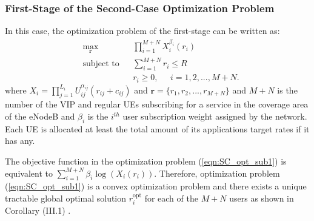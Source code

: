 \documentclass[journal]{IEEEtran} 				\IEEEoverridecommandlockouts 						\usepackage{amsmath,amssymb}
\begin{document}
\subsubsection{First-Stage of the Second-Case Optimization Problem}\label{FC-SS-RA}
In this case, the optimization problem of the first-stage can be written as:
\begin{equation}\label{eqn:SC_opt_sub1}
\begin{aligned}
& \underset{\textbf{r}}{\text{max}}
& & \prod_{i=1}^{M+N}X_i^{\beta_{i}}(r_i) \\
& \text{subject to}
& & \sum_{i=1}^{M+N}r_i \leq R\\
& & & r_i \geq 0, \;\;\;\;\; i = 1,2,...,M+N.
\end{aligned}
\end{equation}
where $X_i=\prod_{j=1}^{L_i}U_{ij}^{\alpha_{ij}}(r_{ij}+c_{ij})$ and $\textbf{r} =\{r_1,r_2,...,r_{M+N}\}$ and $M+N$ is the number of the VIP and regular UEs subscribing for a service in the coverage area of the eNodeB and $\beta_i$ is the $i^{th}$ user subscription weight assigned by the network. Each UE is allocated at least the total amount of its applications target rates if it has any.

The objective function in the optimization problem (\ref{eqn:SC_opt_sub1}) is equivalent to $\sum_{i=1}^{M+N}\beta_i \log(X_i(r_i))$.
Therefore, optimization problem (\ref{eqn:SC_opt_sub1}) is a convex optimization problem and there exists a unique tractable global optimal solution $r_i^{\text{opt}}$ for each of the $M+N$ users as shown in Corollary (III.1) \cite{Ahmed_Utility3}.
\end{document}
